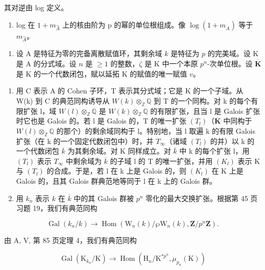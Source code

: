 其对逆由 log 定义。

\begin{enumerate}
\def\labelenumi{\alph{enumi})}
\setcounter{enumi}{3}
\tightlist
\item
  log 在 \(1 + m_{\hat{A}}\) 上的核由阶为 p 的幂的单位根组成。像 \(\log(1 + m_{\hat{A}})\) 等于 \(m_{\hat{A}}\)。
\end{enumerate}

\begin{enumerate}
\def\labelenumi{\arabic{enumi})}
\setcounter{enumi}{13}
\tightlist
\item
  设 A 是特征为零的完备离散赋值环，其剩余域 \(k\) 是特征为 \(p\) 的完美域。设 K 是 A 的分式域。设 \(n\) 是 \(\geqslant 1\) 的整数，\(\zeta\) 是 K 中一个本原 \(p^n\)-次单位根。设 \(\overline{\mathbf{K}}\) 是 K 的一个代数闭包，赋以延拓 K 的赋值的唯一赋值 \(v\)。
\end{enumerate}

\begin{enumerate}
\def\labelenumi{\alph{enumi})}
\item
  用 C 表示 A 的 Cohen 子环，T 表示其分式域；它是 K 的一个子域。从 W(k) 到 C 的典范同构诱导从 \(W(k) \otimes_{\mathbb{Z}} \mathbb{Q}\) 到 T 的一个同构。对 k 的每个有限扩张 l，域 \(W(l) \otimes_{\mathbb{Z}} \mathbb{Q}\) 是 \(W(k) \otimes_{\mathbb{Z}} \mathbb{Q}\) 的有限扩张，且当 l 是 Galois 扩张时它也是 Galois 的。若 l 是 Galois 的，T 的唯一扩张 \((T_l)\)（\(\overline{\mathbf{K}}\) 中同构于 \(W(l) \otimes_{\mathbb{Z}} \mathbb{Q}\) 的那个）的剩余域同构于 l。特别地，当 l 取遍 k 的有限 Galois 扩张（在 k 的一个固定代数闭包中）时，并 \(T_{\infty}\)（诸域 \((T_l)\) 的并）以 k 的一个代数闭包 \(\overline{k}\) 为其剩余域。对 K 同样成立。对 \(\overline{k}\) 中 k 的每个扩张 l，用 \((T_l)\) 表示 \(T_{\infty}\) 中剩余域为 \(\overline{k}\) 的子域 l 的 T 的唯一扩张，并用 \((K_l)\) 表示 K 与 \((T_l)\) 的合成。于是，若 l 在 k 上是 Galois 的，则 \((K_l)\) 在 K 上是 Galois 的，且其 Galois 群典范地等同于 l 在 k 上的 Galois 群。
\item
  用 \(k_n\) 表示 \(k\) 在 \(\overline{k}\) 中的其 Galois 群被 \(p^n\) 零化的最大交换扩张。根据第 45 页习题 19，我们有典范同构
\end{enumerate}

\[
\operatorname{Gal} (k _ {n} / k) \to \operatorname{Hom} (\mathrm{W} _ {n} (k) / \wp \mathrm{W} _ {n} (k), \mathbf {Z} / p ^ {n} \mathbf {Z}).
\]

由 A, V, 第 85 页定理 4，我们有典范同构

\[
\operatorname{Gal} \left(\mathrm{K} _ {k _ {n}} / \mathrm{K}\right)\rightarrow \operatorname{Hom} \left(\mathrm{H} _ {n} / \mathrm{K} ^ {* p ^ {n}}, \mu_ {p _ {n}} (\mathrm{K})\right)
\]

